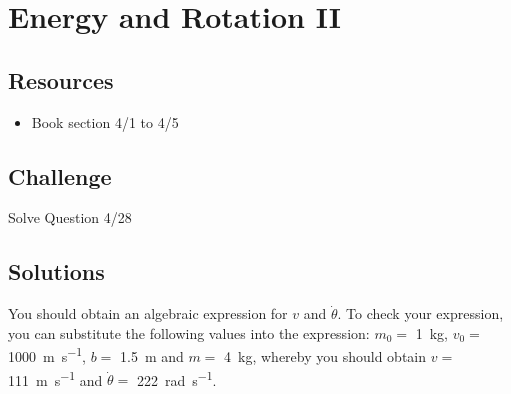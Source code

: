 \newpage
\section{Energy and Rotation II}

\subsection*{Resources}
\begin{itemize}
    \item Book section 4/1 to 4/5
\end{itemize}

\subsection*{Challenge}
Solve Question 4/28

\subsection*{Solutions}
You should obtain an algebraic expression for $v$ and $\dot{\theta}$. To check your expression, you can substitute the following values into the expression:
$m_0=$ \SI{1}{\kg},
$v_0=$ \SI{1000}{\meter\per\second},
$b=$ \SI{1.5}{\meter} and
$m=$ \SI{4}{\kg}, whereby you should obtain
$v=$ \SI{111}{\meter\per\second} and
$\dot{\theta}=$ \SI{222}{\radian\per\second}.




%
%




%
%




